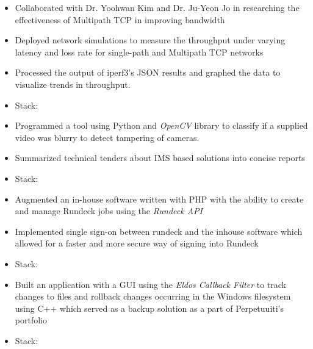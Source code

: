 

\begin{itemize}
    \item Collaborated with Dr. Yoohwan Kim and Dr. Ju-Yeon Jo in researching the effectiveness of Multipath TCP in improving bandwidth
    \item Deployed network simulations to measure the throughput under varying latency and loss rate for single-path and Multipath TCP networks  
    \item Processed the output of iperf3's JSON results and graphed the data to visualize trends in throughput.
    \item Stack:    
\end{itemize}
\divider

\begin{itemize}
    \item Programmed a tool using Python and \emph{OpenCV} library to classify if a supplied video was blurry to detect tampering of cameras. 
     \item Summarized technical tenders about IMS based solutions into concise reports
    \item Stack:   
\end{itemize}
\divider

\begin{itemize}
    \item Augmented an in-house software written with PHP with the ability to create and manage Rundeck jobs using the \emph{Rundeck API}
    \item Implemented single sign-on between rundeck and the inhouse software which allowed for a faster and more secure way of signing into Rundeck
    \item Stack:  
\end{itemize}

\divider

\begin{itemize}
    \item Built an application with a GUI using the \emph{Eldos Callback Filter} to track changes to files and rollback changes occurring in the Windows filesystem using C++ which served as a backup solution as a part of Perpetuuiti's portfolio
    \item Stack:  
\end{itemize}
\divider


